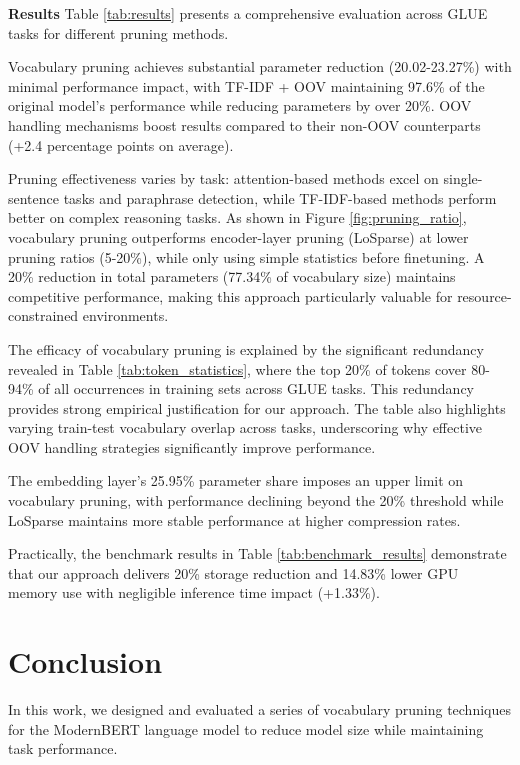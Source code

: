 \documentclass[twocolumn]{article}
\begin{document}
\textbf{Results}
Table \ref{tab:results} presents a comprehensive evaluation across GLUE tasks for different pruning methods. 

Vocabulary pruning achieves substantial parameter reduction (20.02-23.27\%) with minimal performance impact, with TF-IDF + OOV maintaining 97.6\% of the original model's performance while reducing parameters by over 20\%. OOV handling mechanisms boost results compared to their non-OOV counterparts (+2.4 percentage points on average). 

Pruning effectiveness varies by task: attention-based methods excel on single-sentence tasks and paraphrase detection, while TF-IDF-based methods perform better on complex reasoning tasks. As shown in Figure \ref{fig:pruning_ratio}, vocabulary pruning outperforms encoder-layer pruning (LoSparse) at lower pruning ratios (5-20\%), while only using simple statistics before finetuning. A 20\% reduction in total parameters (77.34\% of vocabulary size) maintains competitive performance, making this approach particularly valuable for resource-constrained environments.

The efficacy of vocabulary pruning is explained by the significant redundancy revealed in Table \ref{tab:token_statistics}, where the top 20\% of tokens cover 80-94\% of all occurrences in training sets across GLUE tasks. This redundancy provides strong empirical justification for our approach. The table also highlights varying train-test vocabulary overlap across tasks, underscoring why effective OOV handling strategies significantly improve performance.

The embedding layer's 25.95\% parameter share imposes an upper limit on vocabulary pruning, with performance declining beyond the 20\% threshold while LoSparse maintains more stable performance at higher compression rates. 

Practically, the benchmark results in Table \ref{tab:benchmark_results} demonstrate that our approach delivers 20\% storage reduction and 14.83\% lower GPU memory use with negligible inference time impact (+1.33\%).




\newpage
\section{Conclusion}
In this work, we designed and evaluated a series of vocabulary pruning techniques for the ModernBERT language model to reduce model size while maintaining task performance.
\end{document}
